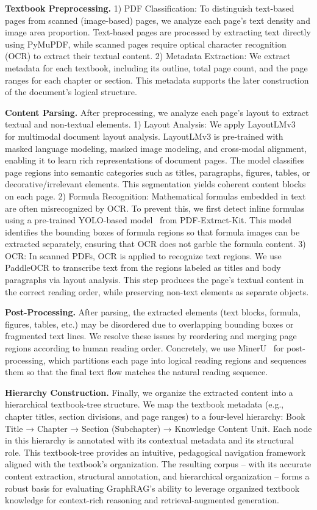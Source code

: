 \documentclass{article}
\begin{document}
\textbf{Textbook Preprocessing.} 1) PDF Classification: To distinguish text-based pages from scanned (image-based) pages, we analyze each page’s text density and image area proportion. Text-based pages are processed by extracting text directly using PyMuPDF, while scanned pages require optical character recognition (OCR) to extract their textual content.
2) Metadata Extraction: We extract metadata for each textbook, including its outline, total page count, and the page ranges for each chapter or section. This metadata supports the later construction of the document’s logical structure.

\textbf{Content Parsing.} After preprocessing, we analyze each page’s layout to extract textual and non-textual elements.
1) Layout Analysis: We apply LayoutLMv3~\cite{LayoutLMv3} for multimodal document layout analysis. LayoutLMv3 is pre-trained with masked language modeling, masked image modeling, and cross-modal alignment, enabling it to learn rich representations of document pages. The model classifies page regions into semantic categories such as titles, paragraphs, figures, tables, or decorative/irrelevant elements. This segmentation yields coherent content blocks on each page.
2) Formula Recognition: Mathematical formulas embedded in text are often misrecognized by OCR. To prevent this, we first detect inline formulas using a pre-trained YOLO-based model~\cite{Yolo} from PDF-Extract-Kit. This model identifies the bounding boxes of formula regions so that formula images can be extracted separately, ensuring that OCR does not garble the formula content.
3) OCR: In scanned PDFs, OCR is applied to recognize text regions. We use PaddleOCR to transcribe text from the regions labeled as titles and body paragraphs via layout analysis. This step produces the page’s textual content in the correct reading order, while preserving non-text elements as separate objects.


\textbf{Post-Processing.} After parsing, the extracted elements (text blocks, formula, figures, tables, etc.) may be disordered due to overlapping bounding boxes or fragmented text lines. We resolve these issues by reordering and merging page regions according to human reading order. Concretely, we use MinerU~\cite{MinerU} for post-processing, which partitions each page into logical reading regions and sequences them so that the final text flow matches the natural reading sequence.

\textbf{Hierarchy Construction.} Finally, we organize the extracted content into a hierarchical textbook-tree structure. We map the textbook metadata (e.g., chapter titles, section divisions, and page ranges) to a four-level hierarchy: Book Title → Chapter → Section (Subchapter) → Knowledge Content Unit. Each node in this hierarchy is annotated with its contextual metadata and its structural role. This textbook-tree provides an intuitive, pedagogical navigation framework aligned with the textbook’s organization. The resulting corpus – with its accurate content extraction, structural annotation, and hierarchical organization – forms a robust basis for evaluating GraphRAG’s ability to leverage organized textbook knowledge for context-rich reasoning and retrieval-augmented generation.
\end{document}
